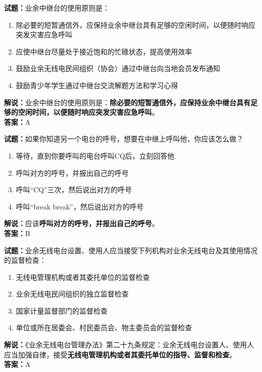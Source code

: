 \documentclass{ctexbook}
\begin{document}
\vspace{\baselineskip}

\noindent\textbf{试题：}业余中继台的使用原则是：
\begin{enumerate}[leftmargin=3em]
  \item 除必要的短暂通信外，应保持业余中继台具有足够的空闲时间，以便随时响应突发灾害应急呼叫
  \item 应使中继台尽量处于接近饱和的忙碌状态，提高使用效率
  \item 鼓励业余无线电民间组织（协会）通过中继台向当地会员发布通知
  \item 鼓励青少年学生通过中继台交流解题方法和学习心得
\end{enumerate}
\noindent\textbf{解说：}业余中继台的使用原则是：\textbf{除必要的短暂通信外，应保持业余中继台具有足够的空闲时间，以便随时响应突发灾害应急呼叫}。\\\noindent\textbf{答案：}A

\vspace{\baselineskip}

\noindent\textbf{试题：}如果你知道另一个电台的呼号，想要在中继上呼叫他，你应该怎么做？
\begin{enumerate}[leftmargin=3em]
  \item 等待，直到你要呼叫的电台呼叫CQ后，立刻回答他
  \item 呼叫对方的呼号，并报出自己的呼号
  \item 呼叫“CQ”三次，然后说出对方的呼号
  \item 呼叫“break break”，然后说出对方的呼号
\end{enumerate}
\noindent\textbf{解说：}应该\textbf{呼叫对方的呼号，并报出自己的呼号}。\\\noindent\textbf{答案：}B

\vspace{\baselineskip}

\noindent\textbf{试题：}业余无线电台设置、使用人应当接受下列机构对业余无线电台及其使用情况的监督检查：
\begin{enumerate}[leftmargin=3em]
  \item 无线电管理机构或者其委托单位的监督检查
  \item 业余无线电民间组织的独立监督检查
  \item 国家计量监督部门的监督检查
  \item 单位或所在居委会、村民委员会、物主委员会的监督检查
\end{enumerate}
\noindent\textbf{解说：}《业余无线电台管理办法》第二十九条规定：业余无线电台设置人、使用人应当加强自律，接受\textbf{无线电管理机构或者其委托单位的指导、监督和检查}。\\\noindent\textbf{答案：}A
\end{document}
